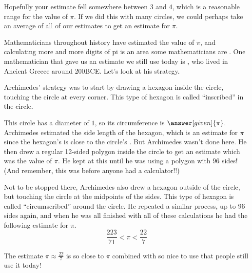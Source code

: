 \documentclass{ximera}
\begin{document}
Hopefully your estimate fell somewhere between $3$ and $4$, which is a reasonable range for the value of $\pi$. If we did this with many circles, we could perhaps take an average of all of our estimates to get an estimate for $\pi$.  

Mathematicians throughout history have estimated the value of $\pi$, and calculating more and more digits of pi is an area some mathematicians are . One mathematician that gave us an estimate we still use today is , who lived in Ancient Greece around 200BCE. Let's look at his strategy.
\begin{example} 
Archimedes' strategy was to start by drawing a hexagon inside the circle, touching the circle at every corner. This type of hexagon is called ``inscribed'' in the circle.
\begin{image}
\end{image}
This circle has a diameter of $1$, so its circumference is $\answer[given]{\pi}$. Archimedes estimated the side length of the hexagon, which is an estimate for $\pi$ since the hexagon's  is close to the circle's . But Archimedes wasn't done here. He then drew a regular 12-sided polygon inside the circle to get an estimate which was  the value of $\pi$. He kept at this until he was using a polygon with $96$ sides! (And remember, this was before anyone had a calculator!!)

Not to be stopped there, Archimedes also drew a hexagon outside of the circle, but touching the circle at the midpoints of the sides. This type of hexagon is called ``circumscribed'' around the circle. He repeated a similar process, up to 96 sides again, and when he was all finished with all of these calculations he had the following estimate for $\pi$.
\[
\frac{223}{71} < \pi < \frac{22}{7}
\]
\end{example}
The estimate $\pi \approx \frac{22}{7}$ is so close to $\pi$ combined with so nice to use that people  still use it today!
\end{document}
